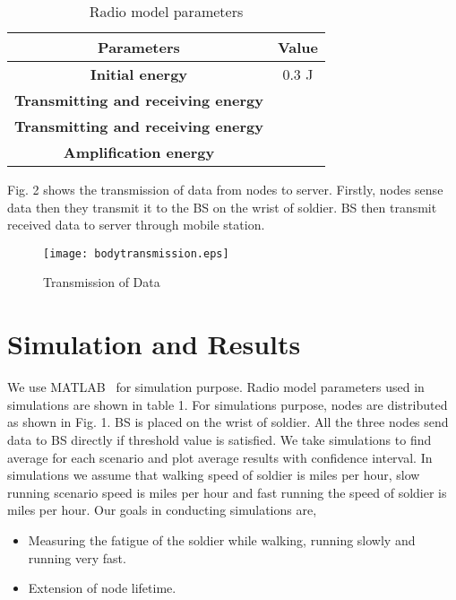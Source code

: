 \documentclass[journal]{IEEEtran}
\begin{document}
 \begin{table}[!ht]
\begin{center}
\caption{Radio model parameters}
  \begin{tabular}{|c|c|}\hline
   \textbf{Parameters}                                           & \textbf{Value}            \\ \hline \hline
    \textbf{Initial energy  }                             &  0.3 J                     \\ \hline
\textbf{Transmitting and receiving energy }       &           \\ \hline
      \textbf{Transmitting and receiving energy }   &            \\ \hline
      \textbf{Amplification energy }                    &                \\ \hline
\end{tabular}
\end{center}
\end{table}

Fig. 2 shows the transmission of data from nodes to server. Firstly, nodes sense data then they transmit it to the BS on the wrist of soldier. BS then transmit
 received data to server through mobile station.

\begin{figure*} [t]
\centering
\texttt{[image: bodytransmission.eps]}
\caption{Transmission of Data}
\end{figure*}


\section{Simulation and Results}
We use MATLAB~\cite{16} for simulation purpose. Radio model parameters used in simulations are shown in table 1. For simulations purpose, nodes are distributed
as shown in Fig. 1. BS is placed on the wrist of soldier. All the three nodes send data to BS directly if threshold value is satisfied. We take 
simulations to find average for each scenario and plot average results with  confidence interval. In simulations we assume that walking speed of soldier
is  miles per hour, slow running scenario speed is  miles per hour and fast running the speed of soldier is  miles per hour. Our goals in
conducting simulations are,
\begin{itemize}
\renewcommand{\labelitemi}{}
\item Measuring the fatigue of the soldier while walking, running slowly and running very fast.
\item Extension of node lifetime.
\end{itemize}
\end{document}
